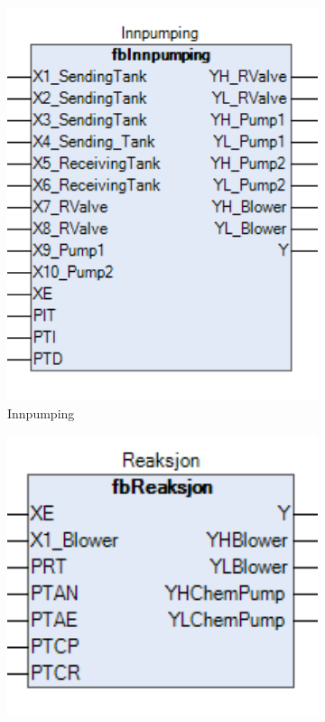 \begin{figure}[htbp]
    \centering
    \begin{subfigure}[b]{0.3\textwidth}
        \centering
        \includegraphics[width=1\textwidth]{Bilder/fbInnpumping.png}
        \caption{Innpumping}\label{fig:fbInnpumping}
    \end{subfigure}
    \hfill
    \begin{subfigure}[b]{0.3\textwidth}
        \centering
        \includegraphics[width=1\textwidth]{Bilder/fbReaksjon.png}

\end{subfigure}
\end{figure}
